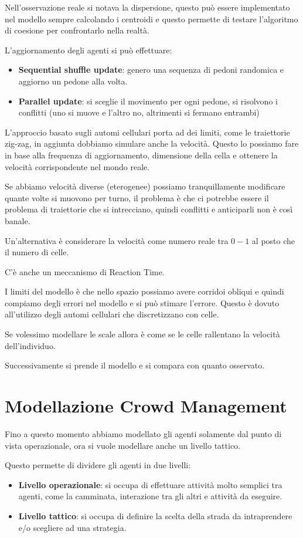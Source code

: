 Nell'osservazione reale si notava la dispersione, questo può essere implementato
nel modello sempre calcolando i centroidi e questo permette di testare l'algoritmo
di coesione per confrontarlo nella realtà.

L'aggiornamento degli agenti si può effettuare:
\begin{itemize}
    \item \textbf{Sequential shuffle update}: genero una sequenza di pedoni
          randomica e aggiorno un pedone alla volta.
    \item \textbf{Parallel update}: si sceglie il movimento per ogni pedone, si
          risolvono i conflitti (uno si muove e l'altro no, altrimenti si fermano
          entrambi)
\end{itemize}
L'approccio basato sugli automi cellulari porta ad dei limiti, come le traiettorie
zig-zag, in aggiunta dobbiamo simulare anche la velocità. Questo lo possiamo fare
in base alla frequenza di aggiornamento, dimensione della cella e ottenere la
velocità corrispondente nel mondo reale.

Se abbiamo velocità diverse (eterogenee) possiamo tranquillamente modificare quante
volte si muovono per turno, il problema è che ci potrebbe essere il problema di
traiettorie che si intrecciano, quindi conflitti e anticiparli non è così banale.

Un'alternativa è considerare la velocità come numero reale tra $0-1$ al posto che
il numero di celle.

C'è anche un meccanismo di Reaction Time.

I limiti del modello è che nello spazio possiamo avere corridoi obliqui e quindi
compiamo degli errori nel modello e si può stimare l'errore. Questo è dovuto
all'utilizzo degli automi cellulari che discretizzano con celle.

Se volessimo modellare le scale allora è come se le celle rallentano la velocità
dell'individuo.

Successivamente si prende il modello e si compara con quanto osservato.
\section{Modellazione Crowd Management}
Fino a questo momento abbiamo modellato gli agenti solamente dal punto di vista
operazionale, ora si vuole modellare anche un livello tattico.

Questo permette di dividere gli agenti in due livelli:
\begin{itemize}
    \item \textbf{Livello operazionale}: si occupa di effettuare attività molto
          semplici tra agenti, come la camminata, interazione tra gli altri e
          attività da eseguire.
    \item \textbf{Livello tattico}: si occupa di definire la scelta della strada
          da intraprendere e/o scegliere ad una strategia.
\end{itemize}

